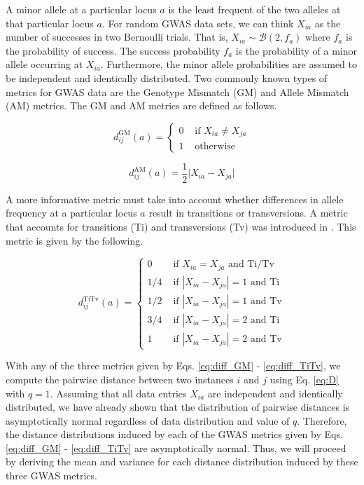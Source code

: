 \documentclass[10pt,letterpaper]{article}\usepackage[]{graphicx}\usepackage[]{color}
\begin{document}
A minor allele at a particular locus $a$ is the least frequent of the two alleles at that particular locus $a$. For random GWAS data sets, we can think $X_{ia}$ as the number of successes in two Bernoulli trials. That is, $X_{ia} \sim \mathcal{B}(2,f_a)$ where $f_a$ is the probability of success. The success probability $f_a$ is the probability of a minor allele occurring at $X_{ia}$. Furthermore, the minor allele probabilities are assumed to be independent and identically distributed. Two commonly known types of metrics for GWAS data are the Genotype Mismatch (GM) and Allele Mismatch (AM) metrics. The GM and AM metrics are defined as follows.

\begin{equation}\label{eq:diff_GM}
d^\text{GM}_{ij}(a) = \begin{cases} 
0 & \text{ if } X_{ia} \neq X_{ja} \\
1 & \text{ otherwise }
\end{cases}
\end{equation}

\begin{equation}\label{eq:diff_AM}
d^\text{AM}_{ij}(a) = \frac{1}{2}\bigl|X_{ia} - X_{ja}\bigr|
\end{equation}

A more informative metric must take into account whether differences in allele frequency at a particular locus $a$ result in transitions or transversions. A metric that accounts for transitions (Ti) and transversions (Tv) was introduced in \cite{arabnejad2018}. This metric is given by the following.

\begin{equation}\label{eq:diff_TiTv}
d^\text{TiTv}_{ij}(a) = \begin{cases}
0 & \text{ if } X_{ia} = X_{ja} \text{ and Ti/Tv} \\
1/4 & \text{ if } |X_{ia} - X_{ja}|=1 \text{ and Ti} \\
1/2 & \text{ if } |X_{ia} - X_{ja}|=1 \text{ and Tv} \\
3/4 & \text{ if } |X_{ia} - X_{ja}|=2 \text{ and Ti} \\
1 & \text{ if } |X_{ia} - X_{ja}|=2 \text{ and Tv}
\end{cases}
\end{equation}

With any of the three metrics given by Eqs. \ref{eq:diff_GM} - \ref{eq:diff_TiTv}, we compute the pairwise distance between two instances $i$ and $j$ using Eq. \ref{eq:D} with $q=1$. Assuming that all data entries $X_{ia}$ are independent and identically distributed, we have already shown that the distribution of pairwise distances is asymptotically normal regardless of data distribution and value of $q$. Therefore, the distance distributions induced by each of the GWAS metrics given by Eqs. \ref{eq:diff_GM} - \ref{eq:diff_TiTv} are asymptotically normal. Thus, we will proceed by deriving the mean and variance for each distance distribution induced by these three GWAS metrics. 
\end{document}
